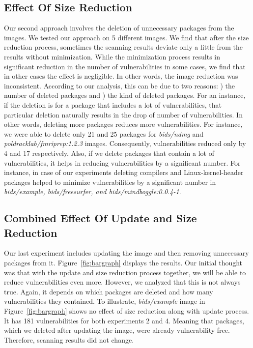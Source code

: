 \documentclass[a4paper,num-refs]{oup-contemporary}
\newcommand{\rom}[1]{\lowercase\expandafter{\romannumeral #1\relax}}
\begin{document}
\subsection{Effect Of Size Reduction}

Our second approach involves the deletion of unnecessary packages from the images.
We tested our approach on 5 different images. We find that
after the size reduction process, sometimes the scanning results deviate only a little from the results
without minimization. While the minimization process results in significant reduction
in the number of vulnerabilities in some cases, we find that in other cases the effect
is negligible. In other words, the image reduction was inconsistent.
According to our analysis, this can be due to two reasons: \rom{1}) the number of
deleted packages
and \rom{2}) the kind of deleted packages. 
For an instance, if the deletion is for a package that includes a lot of vulnerabilities,
that particular deletion naturally results in the drop of number of vulnerabilities.
In other
words, deleting more packages reduces more vulnerabilities. 
For instance, we were able to delete only 21 and 25 packages for 
\textit{bids/ndmg} and \textit{poldracklab/fmriprep:1.2.3} images. Consequently, vulnerabilities
reduced only by 4 and 17 respectively. 
Also, if we delete packages that contain a lot of vulnerabilities, it helps in reducing
vulnerabilities by a significant number. For instance, in case of our experiments
deleting compilers and Linux-kernel-header packages helped to minimize vulnerabilities
by a significant number in \textit{bids/example, bids/freesurfer, and bids/mindboggle:0.0.4-1}. 

\subsection{Combined Effect Of Update and Size Reduction}

Our last experiment includes updating the image and then removing unnecessary packages from it.
Figure~\ref{fig:bargraph} displays the results. 
Our initial thought was that with the update and size reduction process together, we will be able to
reduce vulnerabilities even more. However,
we analyzed that this is not always true. Again, it depends on which packages are deleted and how
many vulnerabilities they contained. To illustrate, \textit{bids/example} image in Figure~\ref{fig:bargraph}
shows no effect of size reduction along with update process. It has 181 vulnerabilities for both experiments 2 and 4.
Meaning that packages, which we deleted after updating the image, were already vulnerability free. Therefore,
scanning results did not change.
\vspace*{-2mm}
\end{document}
